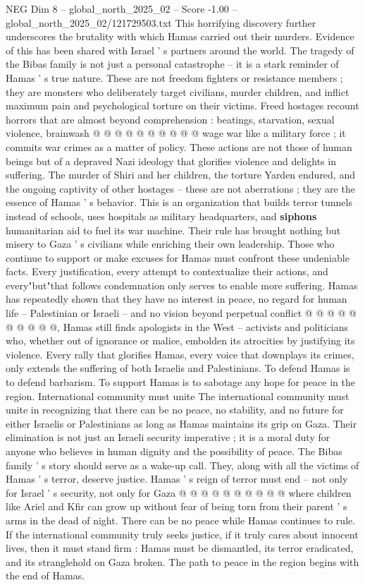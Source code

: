 \begin{textsample}{NEG Dim 8 – global\_north\_2025\_02 – Score -1.00 – global\_north\_2025\_02/121729503.txt}
This horrifying discovery further underscores the brutality with which Hamas carried out their murders.
Evidence of this has been shared with Israel ' s partners around the world.
The tragedy of the Bibas family is not just a personal catastrophe -- it is a stark reminder of Hamas ' s true nature.
These are not freedom fighters or resistance members ; they are monsters who deliberately target civilians, murder children, and inflict maximum pain and psychological torture on their victims.
Freed hostages recount horrors that are almost beyond comprehension : beatings, starvation, sexual violence, brainwash @ @ @ @ @ @ @ @ @ @ wage war like a military force ; it commits war crimes as a matter of policy.
These actions are not those of human beings but of a depraved Nazi ideology that glorifies violence and delights in suffering.
The murder of Shiri and her children, the torture Yarden endured, and the ongoing captivity of other hostages -- these are not aberrations ; they are the essence of Hamas ' s behavior.
This is an organization that builds terror tunnels instead of schools, uses hospitals as military headquarters, and \textbf{siphons} humanitarian aid to fuel its war machine.
Their rule has brought nothing but misery to Gaza ' s civilians while enriching their own leadership.
Those who continue to support or make excuses for Hamas must confront these undeniable facts.
Every justification, every attempt to contextualize their actions, and every"but"that follows condemnation only serves to enable more suffering.
Hamas has repeatedly shown that they have no interest in peace, no regard for human life -- Palestinian or Israeli -- and no vision beyond perpetual conflict @ @ @ @ @ @ @ @ @ @, Hamas still finds apologists in the West -- activists and politicians who, whether out of ignorance or malice, embolden its atrocities by justifying its violence.
Every rally that glorifies Hamas, every voice that downplays its crimes, only extends the suffering of both Israelis and Palestinians.
To defend Hamas is to defend barbarism.
To support Hamas is to sabotage any hope for peace in the region.
International community must unite The international community must unite in recognizing that there can be no peace, no stability, and no future for either Israelis or Palestinians as long as Hamas maintains its grip on Gaza.
Their elimination is not just an Israeli security imperative ; it is a moral duty for anyone who believes in human dignity and the possibility of peace.
The Bibas family ' s story should serve as a wake-up call.
They, along with all the victims of Hamas ' s terror, deserve justice.
Hamas ' s reign of terror must end -- not only for Israel ' s security, not only for Gaza @ @ @ @ @ @ @ @ @ @ where children like Ariel and Kfir can grow up without fear of being torn from their parent ' s arms in the dead of night.
There can be no peace while Hamas continues to rule.
If the international community truly seeks justice, if it truly cares about innocent lives, then it must stand firm : Hamas must be dismantled, its terror eradicated, and its stranglehold on Gaza broken.
The path to peace in the region begins with the end of Hamas.

\end{textsample}

